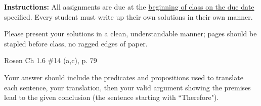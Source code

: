 \documentclass[12pt,addpoints]{exam}
\begin{document}
\extrawidth{0.5in} \extrafootheight{-0.75in} \pagestyle{headandfoot}
\headrule {} \footrule {}

\noindent \textbf{Instructions:} All assignments are due at the
\underline{beginning of class on the due date} specified. Every student
must write up their own solutions in their own manner.

\noindent Please present your solutions in a clean, understandable
manner; pages should be stapled before class, no ragged edges of
paper.


\begin{questions}
\printanswers

\question[16] Rosen Ch 1.6 \#14 (a,c), p. 79

Your answer should include the predicates and propositions used to translate each sentence, your translation, then your valid argument showing the premises lead to the given conclusion (the sentence starting with ``Therefore").


\end{questions}
\end{document}
